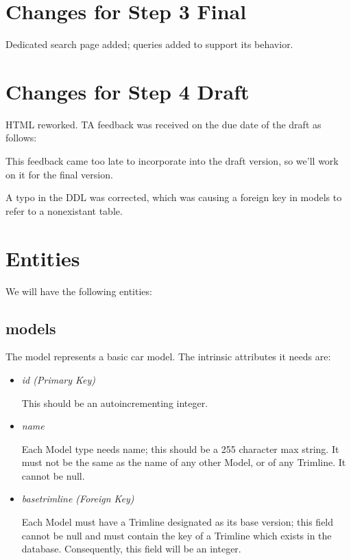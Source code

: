 \documentclass[11pt,letterpaper,oneside]{amsart}
\begin{document}
\section{Changes for Step 3 Final}

Dedicated search page added; queries added to support its behavior.

\section{Changes for Step 4 Draft}

HTML reworked.  TA feedback was received on the due date of the draft as follows:


This feedback came too late to incorporate into the draft version, so we'll work on it for the final version.

A typo in the DDL was corrected, which was causing a foreign key in models to refer to a nonexistant table.



\section*{Entities}

We will have the following entities:

\subsection*{models}
The model represents a basic car model.  The intrinsic attributes it needs are:
\begin{itemize}
	\item \emph{id (Primary Key)}
	
	This should be an autoincrementing integer.
	
	\item \emph{name}
	
	Each Model type needs name; this should be a 255 character max string.  It must not be the same as the name of any other Model, or of any Trimline.  It cannot be null.
	
	\item \emph{base{\textunderscore}trimline (Foreign Key)}
	
	Each Model must have a Trimline designated as its base version; this field cannot be null and must contain the key of a Trimline which exists in the database.  Consequently, this field will be an integer.
	
	
\end{itemize}
\end{document}
